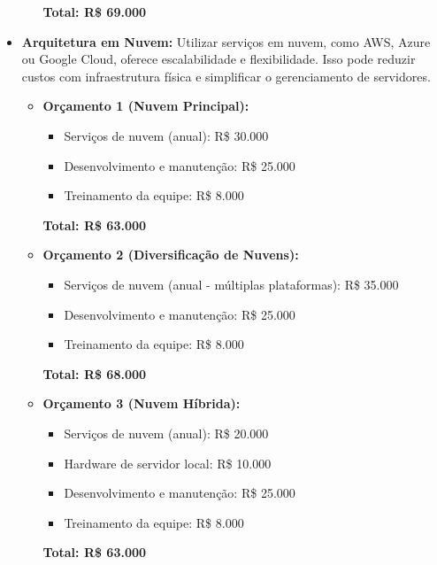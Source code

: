 \begin{itemize}
\begin{itemize}
			\textbf{Total: R\$ 69.000}
		\end{itemize}
		
		
		\item \textbf{Arquitetura em Nuvem:} Utilizar serviços em nuvem, como AWS, Azure ou Google Cloud, oferece escalabilidade e flexibilidade. Isso pode reduzir custos com infraestrutura física e simplificar o gerenciamento de servidores.
		
		\begin{itemize}
			\item \textbf{Orçamento 1 (Nuvem Principal):}
			\begin{itemize}
				\item Serviços de nuvem (anual): R\$ 30.000
				\item Desenvolvimento e manutenção: R\$ 25.000
				\item Treinamento da equipe: R\$ 8.000
			\end{itemize}
			
			\textbf{Total: R\$ 63.000}
			
			\item \textbf{Orçamento 2 (Diversificação de Nuvens):}
			\begin{itemize}
				\item Serviços de nuvem (anual - múltiplas plataformas): R\$ 35.000
				\item Desenvolvimento e manutenção: R\$ 25.000
				\item Treinamento da equipe: R\$ 8.000
			\end{itemize}
			
			\textbf{Total: R\$ 68.000}
			
			\item \textbf{Orçamento 3 (Nuvem Híbrida):}
			\begin{itemize}
				\item Serviços de nuvem (anual): R\$ 20.000
				\item Hardware de servidor local: R\$ 10.000
				\item Desenvolvimento e manutenção: R\$ 25.000
				\item Treinamento da equipe: R\$ 8.000
			\end{itemize}
			
			\textbf{Total: R\$ 63.000}
		\end{itemize}
		
	\end{itemize}
	
